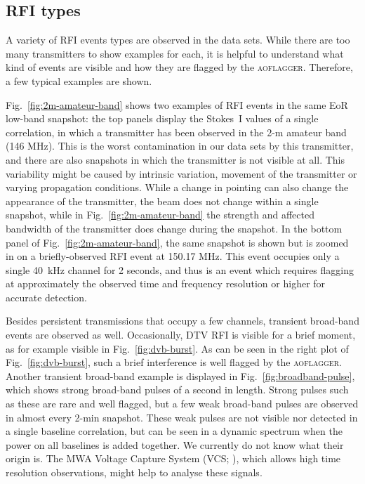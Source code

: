 \documentclass{pasa}
\begin{document}
\subsection{RFI types}
A variety of RFI events types are observed in the data sets. While there are too many transmitters to show examples for each, it is helpful to understand what kind of events are visible and how they are flagged by the \textsc{aoflagger}. Therefore, a few typical examples are shown.

Fig.~\ref{fig:2m-amateur-band} shows two examples of RFI events in the same EoR low-band snapshot: the top panels display the Stokes~I values of a single correlation, in which a transmitter has been observed in the 2-m amateur band (146 MHz). This is the worst contamination in our data sets by this transmitter, and there are also snapshots in which the transmitter is not visible at all. This variability might be caused by intrinsic variation, movement of the transmitter or varying propagation conditions. While a change in pointing can also change the appearance of the transmitter, the beam does not change within a single snapshot, while in Fig.~\ref{fig:2m-amateur-band} the strength and affected bandwidth of the transmitter does change during the snapshot. In the bottom panel of Fig.~\ref{fig:2m-amateur-band}, the same snapshot is shown but is zoomed in on a briefly-observed RFI event at 150.17 MHz. This event occupies only a single 40~kHz channel for 2 seconds, and thus is an event which requires flagging at approximately the observed time and frequency resolution or higher for accurate detection.

Besides persistent transmissions that occupy a few channels, transient broad-band events are observed as well. Occasionally, DTV RFI is visible for a brief moment, as for example visible in Fig.~\ref{fig:dvb-burst}. As can be seen in the right plot of Fig.~\ref{fig:dvb-burst}, such a brief interference is well flagged by the \textsc{aoflagger}. Another transient broad-band example is displayed in Fig.~\ref{fig:broadband-pulse}, which shows strong broad-band pulses of a second in length. Strong pulses such as these are rare and well flagged, but a few weak broad-band pulses are observed in almost every 2-min snapshot. These weak pulses are not visible nor detected in a single baseline correlation, but can be seen in a dynamic spectrum when the power on all baselines is added together. We currently do not know what their origin is. The MWA Voltage Capture System (VCS; \citealt{mwa-voltage-capture-2014}), which allows high time resolution observations, might help to analyse these signals.
\end{document}
